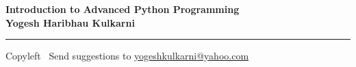 
\graphicspath{{images/}}

\footnotesize


\begin{center}
\Large{\textbf{Introduction to Advanced Python Programming\\ Yogesh Haribhau Kulkarni}}  
\end{center}

\begin{multicols}{2}
	
\end{multicols}

\rule{\linewidth}{0.25pt}
\scriptsize
Copyleft \textcopyleft\  Send suggestions to 
\href{http://www.yogeshkulkarni.com}{yogeshkulkarni@yahoo.com}


